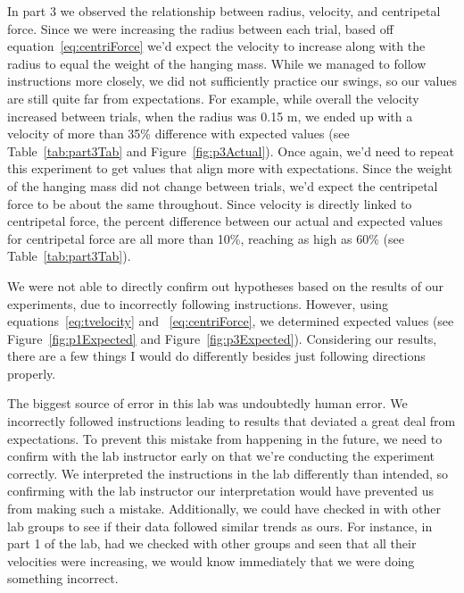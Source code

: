 In part 3 we observed the relationship between radius, velocity, and centripetal force. Since we were increasing the radius between each trial, based off equation~\ref{eq:centriForce} we'd expect the velocity to increase along with the radius to equal the weight of the hanging mass. While we managed to follow instructions more closely, we did not sufficiently practice our swings, so our values are still quite far from expectations. For example, while overall the velocity increased between trials, when the radius was 0.15 m, we ended up with a velocity of more than 35\% difference with expected values (see Table~\ref{tab:part3Tab} and Figure~\ref{fig:p3Actual}). Once again, we'd need to repeat this experiment to get values that align more with expectations. Since the weight of the hanging mass did not change between trials, we'd expect the centripetal force to be about the same throughout. Since velocity is directly linked to centripetal force, the percent difference between our actual and expected values for centripetal force are all more than 10\%, reaching as high as 60\% (see Table~\ref{tab:part3Tab}). 

We were not able to directly confirm out hypotheses based on the results of our experiments, due to incorrectly following instructions. However, using equations~\ref{eq:tvelocity} and ~\ref{eq:centriForce}, we determined expected values (see Figure~\ref{fig:p1Expected} and Figure~\ref{fig:p3Expected}). Considering our results, there are a few things I would do differently besides just following directions properly.

The biggest source of error in this lab was undoubtedly human error. We incorrectly followed instructions leading to results that deviated a great deal from expectations. To prevent this mistake from happening in the future, we need to confirm with the lab instructor early on that we're conducting the experiment correctly. We interpreted the instructions in the lab differently than intended, so confirming with the lab instructor our interpretation would have prevented us from making such a mistake. Additionally, we could have checked in with other lab groups to see if their data followed similar trends as ours. For instance, in part 1 of the lab, had we checked with other groups and seen that all their velocities were increasing, we would know immediately that we were doing something incorrect.  
